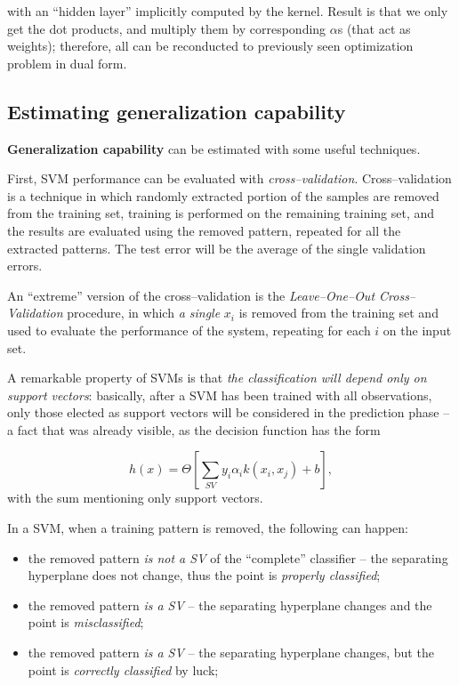 \documentclass[10pt]{report}
\begin{document}
with an ``hidden layer'' implicitly computed by the kernel.
Result is that we only get the dot products, and multiply them by corresponding
\(\alpha\)s (that act as weights); therefore, all can be reconducted to previously seen
optimization problem in dual form.

\subsection{Estimating generalization capability}
\label{sec:org35a66e1}

\textbf{Generalization capability} can be estimated with some useful techniques.

First, SVM performance can be evaluated with \emph{cross--validation}. Cross--validation is
a technique in which randomly extracted portion of the samples are removed from
the training set, training is performed on the remaining training set, and the
results are evaluated using the removed pattern, repeated for all the extracted
patterns. The test error will be the average of the single validation errors.

An ``extreme'' version of the cross--validation is the \emph{Leave--One--Out
Cross--Validation} procedure, in which \emph{a single} \(x_i\) is removed from the
training set and used to evaluate the performance of the system, repeating for
each \(i\) on the input set.

A remarkable property of SVMs is that \emph{the classification will depend only on
support vectors}: basically, after a SVM has been trained with all observations,
only those elected as support vectors will be considered in the prediction phase -- a fact that was already visible, as the decision function has the form

$$h(x) = \Theta\left[\sum_{SV} y_i\alpha_i k(x_i, x_j) + b\right],$$ with the
sum mentioning only support vectors.

In a SVM, when a training pattern is removed, the following can happen:

\begin{itemize}
\item the removed pattern \emph{is not a SV} of the ``complete'' classifier -- the separating hyperplane does not change, thus the point is \emph{properly classified};
\item the removed pattern \emph{is a SV} -- the separating hyperplane changes and the point is \emph{misclassified};
\item the removed pattern \emph{is a SV} -- the separating hyperplane changes, but the point is \emph{correctly classified} by luck;
\end{itemize}
\end{document}
